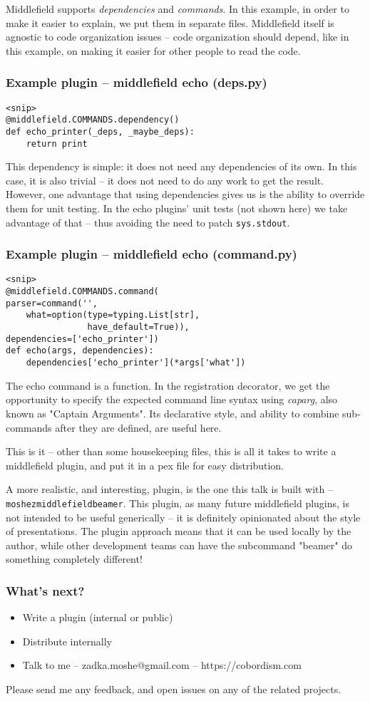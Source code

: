 Middlefield supports {\em dependencies} and {\em commands}.
In this example,
in order to make it easier to explain,
we put them in separate files.
Middlefield itself is agnostic to code organization issues --
code organization should depend,
like in this example,
on making it easier for other people to read the code.

\begin{frame}[fragile]
\frametitle{Example plugin -- middlefield echo (deps.py)}
\begin{lstlisting}
<snip>
@middlefield.COMMANDS.dependency()
def echo_printer(_deps, _maybe_deps):
    return print
\end{lstlisting}
\end{frame}

This dependency is simple:
it does not need any dependencies of its own.
In this case,
it is also trivial --
it does not need to do any work to get the result.
However,
one advantage that using dependencies gives us
is the ability to override them for unit testing.
In the echo plugins' unit tests
(not shown here)
we take advantage of that --
thus avoiding the need to patch \texttt{sys.stdout}.

\begin{frame}[fragile]
\frametitle{Example plugin -- middlefield echo (command.py)}
\begin{lstlisting}
<snip>
@middlefield.COMMANDS.command(
parser=command('',
    what=option(type=typing.List[str],
                have_default=True)),
dependencies=['echo_printer'])
def echo(args, dependencies):
    dependencies['echo_printer'](*args['what'])
\end{lstlisting}
\end{frame}

The echo command is a function.
In the registration decorator,
we get the opportunity to specify the expected command line syntax
using {\em caparg},
also known as
"Captain Arguments".
Its declarative style,
and ability to combine sub-commands after they are defined,
are useful here.

This is it --
other than some housekeeping files,
this is all it takes to write a middlefield plugin,
and put it in a pex file for easy distribution.

A more realistic,
and interesting,
plugin,
is the one this talk is built with --
\texttt{moshez{\textunderscore}middlefield{\textunderscore}beamer}.
This plugin,
as many future middlefield plugins,
is not intended to be useful generically --
it is definitely opinionated about the style
of presentations.
The plugin approach means that it can be used locally by the author,
while other development teams can have the subcommand "beamer"
do something completely different! 

\begin{frame}
\frametitle{What's next?}
\begin{itemize}
\item Write a plugin (internal or public)
\item Distribute internally
\item Talk to me -- zadka.moshe@gmail.com -- https://cobordism.com
\end{itemize}
\end{frame}

Please send me any feedback,
and open issues on any of the related projects.


